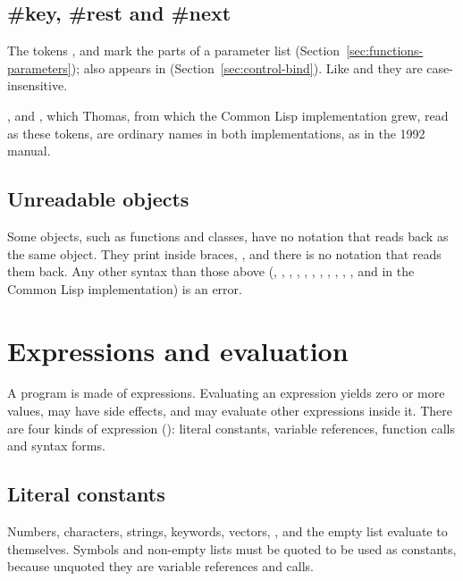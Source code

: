\subsection{\#key, \#rest and \#next}\label{sec:syntax-parameter-tokens}

The tokens ,
 and
 mark the parts of a parameter
list (Section~\ref{sec:functions-parameters});  also appears in
 (Section~\ref{sec:control-bind}). Like  and  they are
case-insensitive.

,  and , which Thomas, from which the
Common Lisp implementation grew, read as these tokens, are ordinary
names in both implementations, as in the 1992 manual.

\subsection{Unreadable objects}

Some objects, such as functions and classes, have no notation that reads
back as the same object. They print inside braces, , and there is no notation that reads them back. Any other
\code{\#} syntax than those above (, ,
\code{\#\textbackslash}, \code{\#(}, , , ,
\code{\#|}, , , , and  in the
Common Lisp implementation) is an error.

\section{Expressions and evaluation}\label{sec:syntax-eval}

A program is made of expressions. Evaluating an expression yields zero or
more values, may have side effects, and may evaluate other expressions
inside it. There are four kinds of expression ():
literal constants, variable references, function calls and syntax forms.

\subsection{Literal constants}

Numbers, characters, strings, keywords, vectors, , 
and the empty list \code{()} evaluate to themselves. Symbols and non-empty
lists must be quoted to be used as constants, because unquoted they are
variable references and calls.

